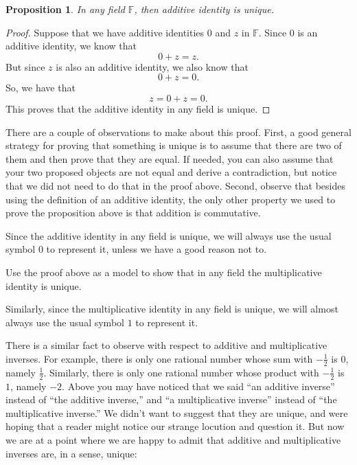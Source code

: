 \documentclass[11pt]{article}
\newenvironment{task}
	{\begin{mdframed}[linecolor=lightgray, linewidth=3pt]\raggedright}
	{\end{mdframed}}
\newtheorem{proposition}[theorem]{Proposition}
\theoremstyle{definition}
\begin{document}
\begin{proposition}
  In any field $\mathbb{F}$, then additive identity is unique.
\end{proposition}
\begin{proof}
  Suppose that we have additive identities $0$ and $z$ in $\mathbb{F}$. Since $0$ is an additive identity, we know that
  \[ 0 + z = z.\]
  But since $z$ is also an additive identity, we also know that
  \[ 0 + z = 0.\]
  So, we have that
  \[ z = 0 + z = 0.\]
  This proves that the additive identity in any field is unique.
\end{proof}

There are a couple of observations to make about this proof. First, a good general strategy for proving that something is unique is to assume that there are
two of them and then prove that they are equal.  If needed, you can also assume that your two proposed objects are not equal and derive a contradiction, but
notice that we did not need to do that in the proof above. Second, observe that besides using the definition of an additive identity, the only other property we
used to prove the proposition above is that addition is commutative.

Since the additive identity in any field is unique, we will always use the usual symbol $0$ to represent it, unless we have a good reason not to. 

\begin{task}
  Use the proof above as a model to show that in any field the multiplicative identity is unique.
\end{task}

Similarly, since the multiplicative identity in any field is unique, we will almost always use the usual symbol $1$ to represent it. 

There is a similar fact to observe with respect to additive and multiplicative inverses. For example, there is only one rational number whose sum with
$-\frac{1}{2}$ is 0, namely $\frac{1}{2}$. Similarly, there is only one rational number whose product with $-\frac{1}{2}$ is $1$, namely $-2$. 
Above you may have noticed that we said ``an additive inverse'' instead of ``the additive inverse,'' and
``a multiplicative inverse'' instead of ``the multiplicative inverse.'' We didn't want to suggest that they are unique, and were hoping that a reader might notice
our strange locution and question it. But now we are at a point where we are happy to admit that additive and multiplicative inverses are, in a sense, unique:
\end{document}
